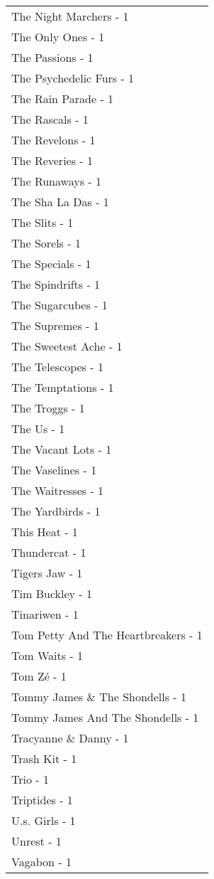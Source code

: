 \documentclass[
]{article}
\begin{document}
\begin{longtable}{l}
The Night Marchers - 1 \\ 
The Only Ones - 1 \\ 
The Passions - 1 \\ 
The Psychedelic Furs - 1 \\ 
The Rain Parade - 1 \\ 
The Rascals - 1 \\ 
The Revelons - 1 \\ 
The Reveries - 1 \\ 
The Runaways - 1 \\ 
The Sha La Das - 1 \\ 
The Slits - 1 \\ 
The Sorels - 1 \\ 
The Specials - 1 \\ 
The Spindrifts - 1 \\ 
The Sugarcubes - 1 \\ 
The Supremes - 1 \\ 
The Sweetest Ache - 1 \\ 
The Telescopes - 1 \\ 
The Temptations - 1 \\ 
The Troggs - 1 \\ 
The Us - 1 \\ 
The Vacant Lots - 1 \\ 
The Vaselines - 1 \\ 
The Waitresses - 1 \\ 
The Yardbirds - 1 \\ 
This Heat - 1 \\ 
Thundercat - 1 \\ 
Tigers Jaw - 1 \\ 
Tim Buckley - 1 \\ 
Tinariwen - 1 \\ 
Tom Petty And The Heartbreakers - 1 \\ 
Tom Waits - 1 \\ 
Tom Zé - 1 \\ 
Tommy James \& The Shondells - 1 \\ 
Tommy James And The Shondells - 1 \\ 
Tracyanne \& Danny - 1 \\ 
Trash Kit - 1 \\ 
Trio - 1 \\ 
Triptides - 1 \\ 
U.s. Girls - 1 \\ 
Unrest - 1 \\ 
Vagabon - 1 \\ 

\end{longtable}
\end{document}
